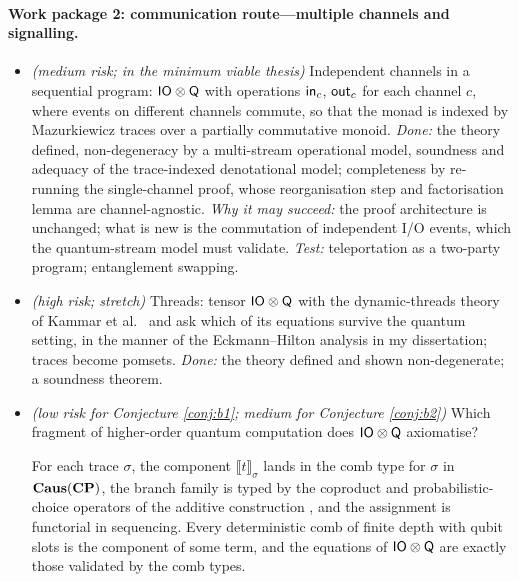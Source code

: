 \paragraph{Work package 2: communication route---multiple channels and signalling.}
\begin{itemize}[nosep]
\item[2a] \textit{(medium risk; in the minimum viable thesis)} Independent channels in a sequential program: $\mathsf{IO}\otimes\mathsf{Q}$ with operations $\mathsf{in}_c$, $\mathsf{out}_c$ for each channel $c$, where events on different channels commute, so that the monad is indexed by Mazurkiewicz traces over a partially commutative monoid. \emph{Done:} the theory defined, non-degeneracy by a multi-stream operational model, soundness and adequacy of the trace-indexed denotational model; completeness by re-running the single-channel proof, whose reorganisation step and factorisation lemma are channel-agnostic. \emph{Why it may succeed:} the proof architecture is unchanged; what is new is the commutation of independent I/O events, which the quantum-stream model must validate. \emph{Test:} teleportation as a two-party program; entanglement swapping.
\item[2a$'$] \textit{(high risk; stretch)} Threads: tensor $\mathsf{IO}\otimes\mathsf{Q}$ with the dynamic-threads theory of Kammar et al.\ \cite{kammar2026threads} and ask which of its equations survive the quantum setting, in the manner of the Eckmann--Hilton analysis in my dissertation; traces become pomsets. \emph{Done:} the theory defined and shown non-degenerate; a soundness theorem.
\item[2b] \textit{(low risk for Conjecture \ref{conj:b1}; medium for Conjecture \ref{conj:b2})} Which fragment of higher-order quantum computation does $\mathsf{IO}\otimes\mathsf{Q}$ axiomatise?
\begin{conj}\label{conj:b2}
For each trace $\sigma$, the component $\llbracket t\rrbracket_\sigma$ lands in the comb type for $\sigma$ in $\mathbf{Caus}(\mathbf{CP})$, the branch family is typed by the coproduct and probabilistic-choice operators of the additive construction \cite{simmons2024thesis}, and the assignment is functorial in sequencing. Every deterministic comb of finite depth with qubit slots is the component of some term, and the equations of $\mathsf{IO}\otimes\mathsf{Q}$ are exactly those validated by the comb types.
\end{conj}

\end{itemize}
